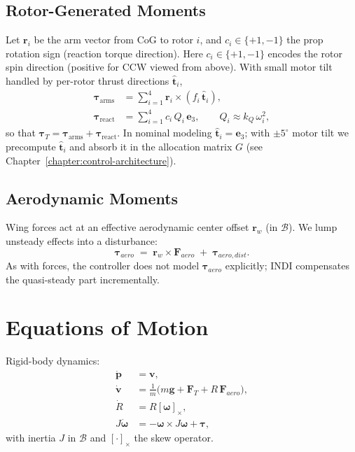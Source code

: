 \subsection{Rotor-Generated Moments}
Let $\mathbf{r}_i$ be the arm vector from CoG to rotor $i$, and $c_i\in\{+1,-1\}$ the prop rotation sign (reaction torque direction). Here $c_i\in\{+1,-1\}$ encodes the rotor spin direction (positive for CCW viewed from above). With small motor tilt handled by per-rotor thrust directions $\hat{\mathbf{t}}_i$,
\begin{align}
\boldsymbol{\tau}_{\text{arms}} &= \sum_{i=1}^4 \mathbf{r}_i \times (f_i\,\hat{\mathbf{t}}_i),\\
\boldsymbol{\tau}_{\text{react}} &= \sum_{i=1}^4 c_i\,Q_i\,\mathbf{e}_3,\qquad Q_i\approx k_Q\,\omega_i^2,
\end{align}
so that $\boldsymbol{\tau}_T=\boldsymbol{\tau}_{\text{arms}}+\boldsymbol{\tau}_{\text{react}}$. In nominal modeling $\hat{\mathbf{t}}_i\!=\!\mathbf{e}_3$; with $\pm5^\circ$ motor tilt we precompute $\hat{\mathbf{t}}_i$ and absorb it in the allocation matrix $G$ (see Chapter~\ref{chapter:control-architecture}).

\subsection{Aerodynamic Moments}
Wing forces act at an effective aerodynamic center offset $\mathbf{r}_w$ (in $\mathcal{B}$). We lump unsteady effects into a disturbance:
\begin{equation}
\boldsymbol{\tau}_{\!aero} \;=\; \mathbf{r}_w \times \mathbf{F}_{\!aero} \;+\; \boldsymbol{\tau}_{\!aero,dist}.
\end{equation}
As with forces, the controller does not model $\boldsymbol{\tau}_{\!aero}$ explicitly; INDI compensates the quasi-steady part incrementally.

\section{Equations of Motion}
Rigid-body dynamics:
\begin{align}
\dot{\mathbf{p}} &= \mathbf{v},\\
\dot{\mathbf{v}} &= \tfrac{1}{m}\big(m\mathbf{g} + \mathbf{F}_T + R\,\mathbf{F}_{\!aero}\big),\\
\dot{R} &= R[\boldsymbol{\omega}]_\times,\\
J\dot{\boldsymbol{\omega}} &= -\boldsymbol{\omega}\times J\boldsymbol{\omega} + \boldsymbol{\tau},
\end{align}
with inertia $J$ in $\mathcal{B}$ and $[\cdot]_\times$ the skew operator.

